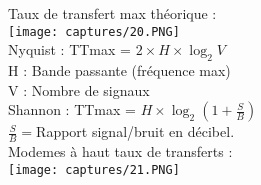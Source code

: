 \documentclass{article}
\begin{document}
    Taux de transfert max théorique : \\ 
    \texttt{[image: captures/20.PNG]} \\
    Nyquist : TTmax = $2 \times H \times \log_2 V$ \\
    H : Bande passante (fréquence max) \\ 
    V : Nombre de signaux \\
    Shannon : TTmax = $H \times \log_2(1+\frac{S}{B})$ \\ 
    $\frac{S}{B}=$Rapport signal/bruit en décibel. \\ 
    \newpage
    Modemes à haut taux de transferts : \\ 
    \texttt{[image: captures/21.PNG]}
\end{document}
